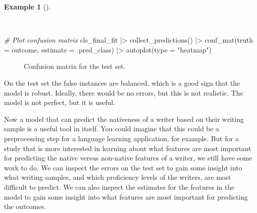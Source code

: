 \documentclass[
  letterpaper,
]{latex/krantz}
\newenvironment{Shaded}{\begin{snugshade}}{\end{snugshade}}
\newcommand{\AttributeTok}[1]{\textcolor[rgb]{0.00,0.00,0.00}{#1}}
\newcommand{\CommentTok}[1]{\textcolor[rgb]{0.00,0.00,0.00}{\textit{#1}}}
\newcommand{\FunctionTok}[1]{\textcolor[rgb]{0.00,0.00,0.00}{#1}}
\newcommand{\NormalTok}[1]{\textcolor[rgb]{0.00,0.00,0.00}{#1}}
\newcommand{\SpecialCharTok}[1]{\textcolor[rgb]{0.00,0.00,0.00}{#1}}
\newcommand{\StringTok}[1]{\textcolor[rgb]{0.00,0.00,0.00}{#1}}
\theoremstyle{definition}
\newtheorem{example}{Example}[chapter]
\theoremstyle{remark}
\begin{document}
\begin{example}[]\protect\hypertarget{exm-pda-class-tune-hyperparameters-evaluate-test-confusion}{}\label{exm-pda-class-tune-hyperparameters-evaluate-test-confusion}

~

\begin{Shaded}
\begin{Highlighting}[]
\CommentTok{\# Plot confusion matrix}
\NormalTok{cls\_final\_fit }\SpecialCharTok{|\textgreater{}}
  \FunctionTok{collect\_predictions}\NormalTok{() }\SpecialCharTok{|\textgreater{}}
  \FunctionTok{conf\_mat}\NormalTok{(}\AttributeTok{truth =}\NormalTok{ outcome, }\AttributeTok{estimate =}\NormalTok{ .pred\_class) }\SpecialCharTok{|\textgreater{}}
  \FunctionTok{autoplot}\NormalTok{(}\AttributeTok{type =} \StringTok{"heatmap"}\NormalTok{)}
\end{Highlighting}
\end{Shaded}

\begin{figure}[H]


\caption{\label{fig-pda-class-tune-hyperparameters-evaluate-test-confusion}Confusion
matrix for the test set.}

\end{figure}%

\end{example}

On the test set the false instances are balanced, which is a good sign
that the model is robust. Ideally, there would be no errors, but this is
not realistic. The model is not perfect, but it is useful.

Now a model that can predict the nativeness of a writer based on their
writing sample is a useful tool in itself. You could imagine that this
could be a preprocessing step for a language learning application, for
example. But for a study that is more interested in learning about what
features are most important for predicting the native versus non-native
features of a writer, we still have some work to do. We can inspect the
errors on the test set to gain some insight into what writing samples,
and which proficiency levels of the writers, are most difficult to
predict. We can also inspect the estimates for the features in the model
to gain some insight into what features are most important for
predicting the outcomes.
\end{document}
